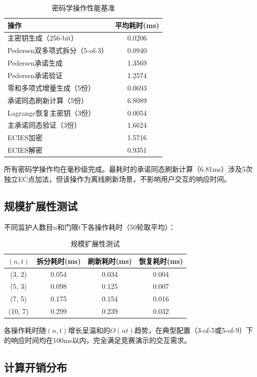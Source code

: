 \documentclass[UTF8,a4paper,zihao=-4,openany]{ctexrep}
\begin{document}
\begin{table}[H]
\centering
\caption{密码学操作性能基准}
\label{tab:perf_bench}
\begin{tabularx}{\textwidth}{lc}
\toprule
操作 & 平均耗时(ms)\\
\midrule
主密钥生成（256-bit） & 0.0206\\
Pedersen双多项式拆分（5-of-3） & 0.0940\\
Pedersen承诺生成 & 1.3569\\
Pedersen承诺验证 & 1.2574\\
零和多项式增量生成（5份） & 0.0693\\
承诺同态刷新计算（5份） & 6.8089\\
Lagrange恢复主密钥（3份） & 0.0054\\
主承诺同态验证（3份） & 1.6624\\
ECIES加密 & 1.5716\\
ECIES解密 & 0.9351\\
\bottomrule
\end{tabularx}
\end{table}

所有密码学操作均在毫秒级完成。最耗时的承诺同态刷新计算（6.81ms）涉及5次独立EC点加法，但该操作为离线刷新场景，不影响用户交互的响应时间。

\subsection{规模扩展性测试}

不同监护人数目$n$和门限$t$下各操作耗时（50轮取平均）：

\begin{table}[H]
\centering
\caption{规模扩展性测试}
\label{tab:scalability}
\begin{tabularx}{\textwidth}{cccc}
\toprule
$(n, t)$ & 拆分耗时(ms) & 刷新耗时(ms) & 恢复耗时(ms)\\
\midrule
(3, 2) & 0.054 & 0.034 & 0.004\\
(5, 3) & 0.098 & 0.125 & 0.007\\
(7, 5) & 0.175 & 0.154 & 0.016\\
(10, 7) & 0.299 & 0.239 & 0.032\\
\bottomrule
\end{tabularx}
\end{table}

各操作耗时随$(n,t)$增长呈温和的$O(nt)$趋势，在典型配置（3-of-5或5-of-9）下的响应时间均在100ms以内，完全满足竞赛演示的交互需求。

\subsection{计算开销分布}
\end{document}

